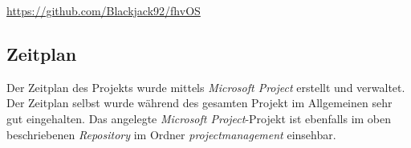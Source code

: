 \url{https://github.com/Blackjack92/fhvOS} \\

\subsection{Zeitplan}
Der Zeitplan des Projekts wurde mittels \textit{Microsoft Project} erstellt und verwaltet. Der Zeitplan selbst wurde während des gesamten Projekt im Allgemeinen sehr gut eingehalten. Das angelegte \textit{Microsoft Project}-Projekt ist ebenfalls im oben beschriebenen \textit{Repository} im Ordner \textit{projectmanagement} einsehbar.

\pagebreak 
